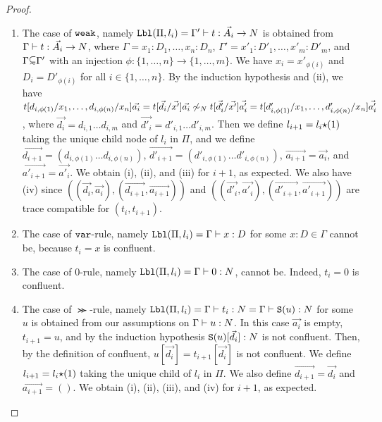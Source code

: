 \begin{proof}
  \begin{enumerate}
  \item
    The case of ${\tt weak}$, namely
    ${\tt Lbl}(\Pi,l_i) = \Gamma'\vdash t:\vec{A_i}\rightarrow{N}$
    is obtained from $\Gamma\vdash t:\vec{A_i}\rightarrow{N}$, where
    $\Gamma = x_1:D_1,\ldots,x_n:D_n$, $\Gamma' = x'_1:D'_1,\ldots,x'_m:D'_m$, and $\Gamma \subseteqsim \Gamma'$
    with an injection $\phi:\{1,\ldots,n\}\to\{1,\ldots,m\}$. 
    We have $x_i = x'_{\phi(i)}$ and $D_i = D'_{\phi(i)}$ for all $i \in \{1,\ldots,n\}$.
    By the induction hypothesis and (ii), we have 
    $t[d_{i,\phi(1)}/x_1,\ldots,d_{i,\phi(n)}/x_n]\vec{a_i} = t[\vec{d_i}/\vec{x'}]\vec{a_i} \not\sim_{N} t[\vec{d'_i}/\vec{x'}]\vec{a'_i} = t[d'_{i,\phi(1)}/x_1,\ldots,d'_{i,\phi(n)}/x_n]\vec{a'_i}$, 
    where $\vec{d_i} = d_{i,1}\ldots d_{i,m}$ and $\vec{d'_i} = d'_{i,1}\ldots d'_{i,m}$.
    Then we define $l_{i+1} = l_i {\star} (1)$ taking the unique child node of $l_i$ in $\Pi$, and we
    define
    $\vec{d_{i+1}} = (d_{i,\phi(1)}\ldots d_{i,\phi(n)})$, 
    $\vec{d'_{i+1}} = (d'_{i,\phi(1)}\ldots d'_{i,\phi(n)})$, 
    $\vec{a_{i+1}} = \vec{a_i}$, and $\vec{a'_{i+1}} = \vec{a'_i}$. 
    We obtain (i), (ii), and (iii) for $i+1$, as expected.
    We also have (iv) since $((\vec{d_i},\vec{a_i}),(\vec{d_{i+1}},\vec{a_{i+1}}))$
    and $((\vec{d'_i},\vec{a'_i}),(\vec{d'_{i+1}},\vec{a'_{i+1}}))$
    are trace compatible for $(t_i,t_{i+1})$. 

  \item
    The case of ${\tt var}$-rule, namely ${\tt Lbl}(\Pi,l_i) = \Gamma\vdash x:D$ for some $x:D \in \Gamma$
    cannot be, because $t_i = x$ is confluent. 

  \item
    The case of $0$-rule, namely ${\tt Lbl}(\Pi,l_i) = \Gamma\vdash 0:{N}$, cannot be.
    Indeed, $t_i = 0$ is confluent. 

  \item  
    The case of $\Succ$-rule, namely ${\tt Lbl}(\Pi,l_i) = 
    \Gamma\vdash t_i: {N} = \Gamma\vdash {\tt S}(u): {N}$ for some $u$ 
    is obtained from our assumptions on
    $\Gamma\vdash u: {N}$. In this case $\vec{a_i}$ is empty, $t_{i+1}=u$, and
    by the induction hypothesis ${\tt S}(u)[\vec{d_i}]:{N}$ is not confluent. 
    Then, by the definition of confluent, $u[\vec{d_i}] =t_{i+1}[\vec{d_i}] $ is not confluent. 
    We define $l_{i+1} = l_i {\star} (1)$ taking the unique child of $l_i$ in $\Pi$. 
    We also define $\vec{d_{i+1}} = \vec{d_i}$ and $\vec{a_{i+1}} = ()$.  
    We obtain (i), (ii), (iii), and (iv) for $i+1$, as expected.


\end{enumerate}
\end{proof}
